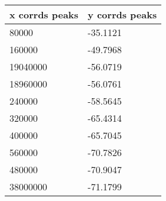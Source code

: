 \begin{tabular}{ll}
x corrds peaks & y corrds peaks \\ 
\hline 
80000 & -35.1121 \\ 
160000 & -49.7968 \\ 
19040000 & -56.0719 \\ 
18960000 & -56.0761 \\ 
240000 & -58.5645 \\ 
320000 & -65.4314 \\ 
400000 & -65.7045 \\ 
560000 & -70.7826 \\ 
480000 & -70.9047 \\ 
38000000 & -71.1799 \\ 
\hline 
\end{tabular}